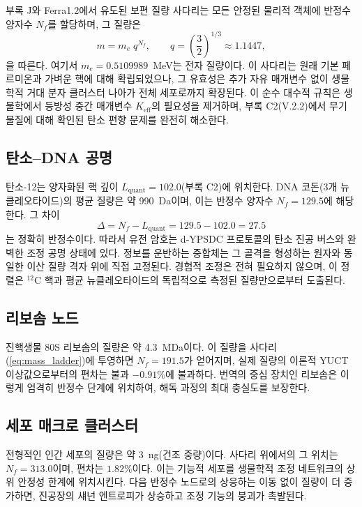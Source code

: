 \documentclass[12pt,a4paper]{article}
\begin{document}
	부록 J와 Ferra1.2에서 유도된 보편 질량 사다리는 모든 안정된 물리적 객체에 반정수 양자수 \(N_f\)를 할당하며, 그 질량은
	\begin{equation}
		m = m_e \; q^{N_f}, \qquad q = \left(\frac{3}{2}\right)^{1/3} \approx 1.1447,
		\label{eq:mass_ladder}
	\end{equation}
	을 따른다. 여기서 \(m_e = 0.5109989\)~MeV는 전자 질량이다. 이 사다리는 원래 기본 페르미온과 가벼운 핵에 대해 확립되었으나, 그 유효성은 추가 자유 매개변수 없이 생물학적 거대 분자 클러스터 나아가 전체 세포로까지 확장된다. 이 순수 대수적 규칙은 생물학에서 등방성 중간 매개변수 \(K_{\mathrm{eff}}\)의 필요성을 제거하며, 부록 C2(V.2.2)에서 무기 물질에 대해 확인된 탄소 편향 문제를 완전히 해소한다.
	
	\subsection{탄소–DNA 공명}
	탄소-12는 양자화된 핵 깊이 \(L_{\mathrm{quant}} = 102.0\)(부록 C2)에 위치한다. DNA 코돈(3개 뉴클레오타이드)의 평균 질량은 약 990~Da이며, 이는 반정수 양자수 \(N_f = 129.5\)에 해당한다. 그 차이
	\[
	\Delta = N_f - L_{\mathrm{quant}} = 129.5 - 102.0 = 27.5
	\]
	는 정확히 반정수이다. 따라서 유전 암호는 d‑YPSDC 프로토콜의 탄소 진공 버스와 완벽한 조정 공명 상태에 있다. 정보를 운반하는 중합체는 그 골격을 형성하는 원자와 동일한 이산 질량 격자 위에 직접 고정된다. 경험적 조정은 전혀 필요하지 않으며, 이 정렬은 \(^{12}\mathrm{C}\) 핵과 평균 뉴클레오타이드의 독립적으로 측정된 질량만으로부터 도출된다.
	
	\subsection{리보솜 노드}
	진핵생물 80S 리보솜의 질량은 약 4.3~MDa이다. 이 질량을 사다리 (\ref{eq:mass_ladder})에 투영하면 \(N_f = 191.5\)가 얻어지며, 실제 질량의 이론적 YUCT 이상값으로부터의 편차는 불과 \(-0.91\%\)에 불과하다. 번역의 중심 장치인 리보솜은 이렇게 엄격히 반정수 단계에 위치하여, 해독 과정의 최대 충실도를 보장한다.
	
	\subsection{세포 매크로 클러스터}
	전형적인 인간 세포의 질량은 약 3~ng(건조 중량)이다. 사다리 위에서의 그 위치는 \(N_f = 313.0\)이며, 편차는 \(1.82\%\)이다. 이는 기능적 세포를 생물학적 조정 네트워크의 상위 안정성 한계에 위치시킨다. 다음 반정수 노드로의 상응하는 이동 없이 질량이 더 증가하면, 진공장의 섀넌 엔트로피가 상승하고 조정 기능의 붕괴가 촉발된다.
	
\end{document}
